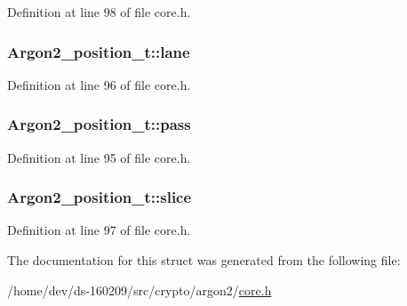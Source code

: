 Definition at line 98 of file core.\+h.

\hypertarget{struct_argon2__position__t_ac17e6249186213e0ddbaa1b469df7283}{}
\subsubsection[{lane}]{ Argon2\+\_\+position\+\_\+t\+::lane}\label{struct_argon2__position__t_ac17e6249186213e0ddbaa1b469df7283}


Definition at line 96 of file core.\+h.

\hypertarget{struct_argon2__position__t_aa216fa94d8094fe78f18b3979ddfb471}{}
\subsubsection[{pass}]{ Argon2\+\_\+position\+\_\+t\+::pass}\label{struct_argon2__position__t_aa216fa94d8094fe78f18b3979ddfb471}


Definition at line 95 of file core.\+h.

\hypertarget{struct_argon2__position__t_a3fba685c73afabb933fb48088fc3c063}{}
\subsubsection[{slice}]{ Argon2\+\_\+position\+\_\+t\+::slice}\label{struct_argon2__position__t_a3fba685c73afabb933fb48088fc3c063}


Definition at line 97 of file core.\+h.



The documentation for this struct was generated from the following file\+:\begin{DoxyCompactItemize}
\item 
/home/dev/ds-\/160209/src/crypto/argon2/\hyperlink{core_8h}{core.\+h}\end{DoxyCompactItemize}
